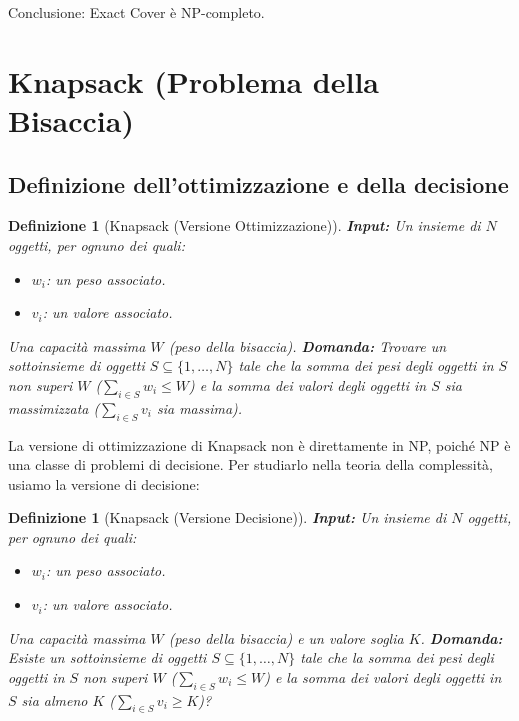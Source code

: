 \documentclass[a4paper, 11pt]{book} %
\newtheorem{definition}[theorem]{Definizione}
\theoremstyle{definition}
\begin{document}
Conclusione: Exact Cover è NP-completo.

\section{Knapsack (Problema della Bisaccia)}

\subsection{Definizione dell'ottimizzazione e della decisione}

\begin{definition}[Knapsack (Versione Ottimizzazione)]
\textbf{Input:}
Un insieme di $N$ oggetti, per ognuno dei quali:
\begin{itemize}
    \item $w_i$: un peso associato.
    \item $v_i$: un valore associato.
\end{itemize}
Una capacità massima $W$ (peso della bisaccia).
\textbf{Domanda:} Trovare un sottoinsieme di oggetti $S \subseteq \{1, \ldots, N\}$ tale che la somma dei pesi degli oggetti in $S$ non superi $W$ ($\sum_{i \in S} w_i \le W$) e la somma dei valori degli oggetti in $S$ sia massimizzata ($\sum_{i \in S} v_i$ sia massima).
\end{definition}

La versione di ottimizzazione di Knapsack non è direttamente in NP, poiché NP è una classe di problemi di decisione. Per studiarlo nella teoria della complessità, usiamo la versione di decisione:

\begin{definition}[Knapsack (Versione Decisione)]
\textbf{Input:}
Un insieme di $N$ oggetti, per ognuno dei quali:
\begin{itemize}
    \item $w_i$: un peso associato.
    \item $v_i$: un valore associato.
\end{itemize}
Una capacità massima $W$ (peso della bisaccia) e un valore soglia $K$.
\textbf{Domanda:} Esiste un sottoinsieme di oggetti $S \subseteq \{1, \ldots, N\}$ tale che la somma dei pesi degli oggetti in $S$ non superi $W$ ($\sum_{i \in S} w_i \le W$) e la somma dei valori degli oggetti in $S$ sia almeno $K$ ($\sum_{i \in S} v_i \ge K$)?
\end{definition}
\end{document}
